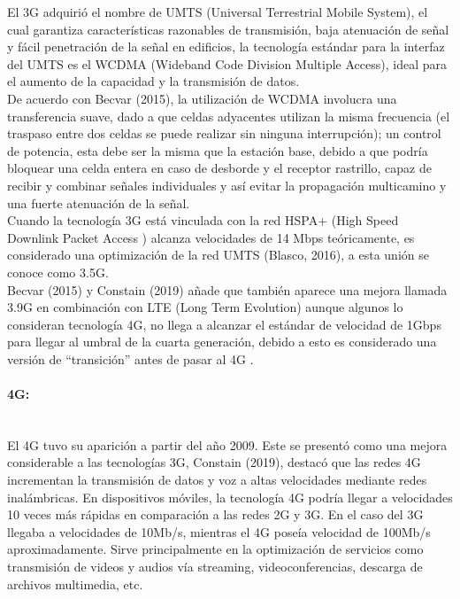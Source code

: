 \documentclass[12pt,a4paper]{article}
\begin{document}
	El 3G adquirió el nombre de UMTS (Universal Terrestrial Mobile System), el cual garantiza características razonables de transmisión, baja atenuación de señal y fácil penetración de la señal en edificios, la tecnología estándar para la interfaz del UMTS es el WCDMA (Wideband Code Division Multiple Access), ideal para el aumento de la capacidad y la transmisión de datos.\\
	
	De acuerdo con Becvar (2015), la utilización de WCDMA involucra una transferencia suave, dado a que celdas adyacentes utilizan la misma frecuencia (el traspaso entre dos celdas se puede realizar sin ninguna interrupción); un control de potencia, esta debe ser la misma que la estación base, debido a que podría bloquear una celda entera en caso de desborde y el receptor rastrillo, capaz de recibir y combinar señales individuales y así evitar la propagación multicamino y una fuerte atenuación de la señal.\\
	
	Cuando la tecnología 3G está vinculada con la red HSPA+ (High Speed Downlink Packet Access ) alcanza velocidades de 14 Mbps teóricamente, es considerado una optimización de la red UMTS (Blasco, 2016), a esta unión se conoce como 3.5G.\\
	
	Becvar (2015) y Constain (2019) añade que también aparece una mejora llamada 3.9G en combinación con LTE (Long Term Evolution) aunque algunos lo consideran tecnología 4G, no llega a alcanzar el estándar de velocidad de 1Gbps para llegar al umbral de la cuarta generación, debido a esto es considerado una versión de “transición” antes de pasar al 4G .
	
	\paragraph*{4G:} \mbox{}\\
	
	
	El  4G tuvo su aparición a partir del año 2009. Este se  presentó como una mejora considerable a las tecnologías 3G, Constain (2019), destacó que las redes 4G incrementan la transmisión de datos y voz a altas velocidades mediante redes inalámbricas. En dispositivos móviles, la tecnología 4G podría llegar a velocidades 10 veces más rápidas en comparación a las redes 2G y 3G. En el caso del 3G llegaba a velocidades de 10Mb/s, mientras el 4G poseía velocidad  de 100Mb/s aproximadamente. Sirve principalmente en la optimización de servicios como transmisión de videos y audios vía streaming, videoconferencias, descarga de archivos multimedia, etc.\\
	
\end{document}
